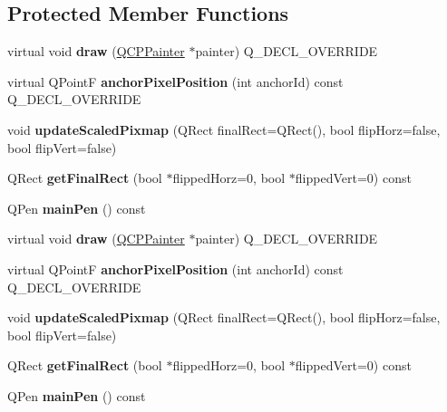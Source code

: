 \subsection*{Protected Member Functions}
\begin{DoxyCompactItemize}
\item 
\mbox{\label{class_q_c_p_item_pixmap_a9538a7d37fe20a4ff4bb2cb5bbbf2b48}} 
virtual void {\bfseries draw} (\hyperlink{class_q_c_p_painter}{Q\+C\+P\+Painter} $\ast$painter) Q\+\_\+\+D\+E\+C\+L\+\_\+\+O\+V\+E\+R\+R\+I\+DE
\item 
\mbox{\label{class_q_c_p_item_pixmap_a5803d8e173bc4d48619fc43701db32e5}} 
virtual Q\+PointF {\bfseries anchor\+Pixel\+Position} (int anchor\+Id) const Q\+\_\+\+D\+E\+C\+L\+\_\+\+O\+V\+E\+R\+R\+I\+DE
\item 
\mbox{\label{class_q_c_p_item_pixmap_a8bced3027b326b290726cd1979c7cfc6}} 
void {\bfseries update\+Scaled\+Pixmap} (Q\+Rect final\+Rect=Q\+Rect(), bool flip\+Horz=false, bool flip\+Vert=false)
\item 
\mbox{\label{class_q_c_p_item_pixmap_a4e7d803e5093c457a109f8fae56677c2}} 
Q\+Rect {\bfseries get\+Final\+Rect} (bool $\ast$flipped\+Horz=0, bool $\ast$flipped\+Vert=0) const
\item 
\mbox{\label{class_q_c_p_item_pixmap_aad6dddd67163831538d40023a98a9fe7}} 
Q\+Pen {\bfseries main\+Pen} () const
\item 
\mbox{\label{class_q_c_p_item_pixmap_a721462da0bbccac5e8759921390b1197}} 
virtual void {\bfseries draw} (\hyperlink{class_q_c_p_painter}{Q\+C\+P\+Painter} $\ast$painter) Q\+\_\+\+D\+E\+C\+L\+\_\+\+O\+V\+E\+R\+R\+I\+DE
\item 
\mbox{\label{class_q_c_p_item_pixmap_a5d576c14fdc7999c000a6aed1b7c2fb0}} 
virtual Q\+PointF {\bfseries anchor\+Pixel\+Position} (int anchor\+Id) const Q\+\_\+\+D\+E\+C\+L\+\_\+\+O\+V\+E\+R\+R\+I\+DE
\item 
\mbox{\label{class_q_c_p_item_pixmap_a8bced3027b326b290726cd1979c7cfc6}} 
void {\bfseries update\+Scaled\+Pixmap} (Q\+Rect final\+Rect=Q\+Rect(), bool flip\+Horz=false, bool flip\+Vert=false)
\item 
\mbox{\label{class_q_c_p_item_pixmap_a4e7d803e5093c457a109f8fae56677c2}} 
Q\+Rect {\bfseries get\+Final\+Rect} (bool $\ast$flipped\+Horz=0, bool $\ast$flipped\+Vert=0) const
\item 
\mbox{\label{class_q_c_p_item_pixmap_aad6dddd67163831538d40023a98a9fe7}} 
Q\+Pen {\bfseries main\+Pen} () const
\end{DoxyCompactItemize}
